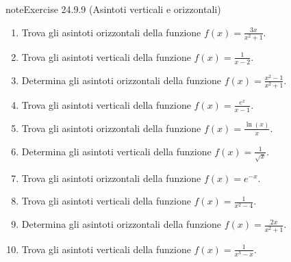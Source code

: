\documentclass[letterpaper,10pt,italian]{jupyterBook}
\begin{document}
\begin{sphinxadmonition}{note}{Exercise 24.9.9 (Asintoti verticali e orizzontali)}


\begin{enumerate}
%
\item {} 
\sphinxAtStartPar
Trova gli asintoti orizzontali della funzione \(f(x) = \frac{3x}{x^2 + 1}\).

\item {} 
\sphinxAtStartPar
Trova gli asintoti verticali della funzione \(f(x) = \frac{1}{x - 2}\).

\item {} 
\sphinxAtStartPar
Determina gli asintoti orizzontali della funzione \(f(x) = \frac{x^2 - 1}{x^2 + 1}\).

\item {} 
\sphinxAtStartPar
Trova gli asintoti verticali della funzione \(f(x) = \frac{e^x}{x - 1}\).

\item {} 
\sphinxAtStartPar
Trova gli asintoti orizzontali della funzione \(f(x) = \frac{\ln(x)}{x}\).

\item {} 
\sphinxAtStartPar
Determina gli asintoti verticali della funzione \(f(x) = \frac{1}{\sqrt{x}}\).

\item {} 
\sphinxAtStartPar
Trova gli asintoti orizzontali della funzione \(f(x) = e^{-x}\).

\item {} 
\sphinxAtStartPar
Trova gli asintoti verticali della funzione \(f(x) = \frac{1}{x^2 - 4}\).

\item {} 
\sphinxAtStartPar
Determina gli asintoti orizzontali della funzione \(f(x) = \frac{2x}{x^2 + 1}\).

\item {} 
\sphinxAtStartPar
Trova gli asintoti verticali della funzione \(f(x) = \frac{1}{x^3 - x}\).

\end{enumerate}
\end{sphinxadmonition}


 \label{exercise:ex-limits-fun-study}
\end{document}
